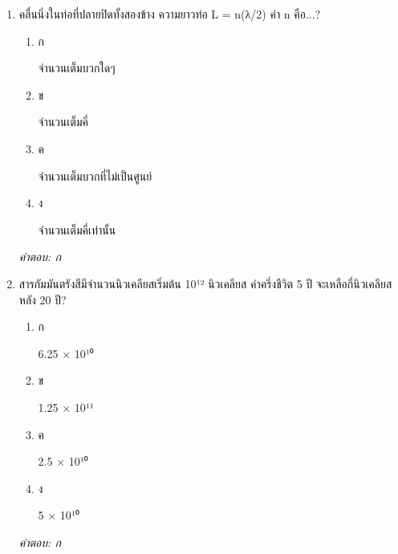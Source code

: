 \documentclass[12pt]{article}
\begin{document}
\begin{enumerate}[label=\arabic*., itemsep=0.5\baselineskip, topsep=0.5\baselineskip, leftmargin=*]
\item คลื่นนิ่งในท่อที่ปลายปิดทั้งสองข้าง ความยาวท่อ L = n(λ/2) ค่า n คือ...?
\begin{enumerate}[label=\alph*)., itemsep=0.3\baselineskip, topsep=0.3\baselineskip]
\item ก\ 
\begin{minipage}[t]{0.9\linewidth}
\raggedright จำนวนเต็มบวกใดๆ
\end{minipage}
\item ข\ 
\begin{minipage}[t]{0.9\linewidth}
\raggedright จำนวนเต็มคี่
\end{minipage}
\item ค\ 
\begin{minipage}[t]{0.9\linewidth}
\raggedright จำนวนเต็มบวกที่ไม่เป็นศูนย์
\end{minipage}
\item ง\ 
\begin{minipage}[t]{0.9\linewidth}
\raggedright จำนวนเต็มคี่เท่านั้น
\end{minipage}
\end{enumerate}
\vspace{-0.3\baselineskip}
\begin{small}
\textit{คำตอบ: ก}
\end{small}

\item สารกัมมันตรังสีมีจำนวนนิวเคลียสเริ่มต้น 10¹² นิวเคลียส ค่าครึ่งชีวิต 5 ปี จะเหลือกี่นิวเคลียสหลัง 20 ปี?
\begin{enumerate}[label=\alph*)., itemsep=0.3\baselineskip, topsep=0.3\baselineskip]
\item ก\ 
\begin{minipage}[t]{0.9\linewidth}
\raggedright 6.25 × 10¹⁰
\end{minipage}
\item ข\ 
\begin{minipage}[t]{0.9\linewidth}
\raggedright 1.25 × 10¹¹
\end{minipage}
\item ค\ 
\begin{minipage}[t]{0.9\linewidth}
\raggedright 2.5 × 10¹⁰
\end{minipage}
\item ง\ 
\begin{minipage}[t]{0.9\linewidth}
\raggedright 5 × 10¹⁰
\end{minipage}
\end{enumerate}
\vspace{-0.3\baselineskip}
\begin{small}
\textit{คำตอบ: ก}
\end{small}


\end{enumerate}
\end{document}
